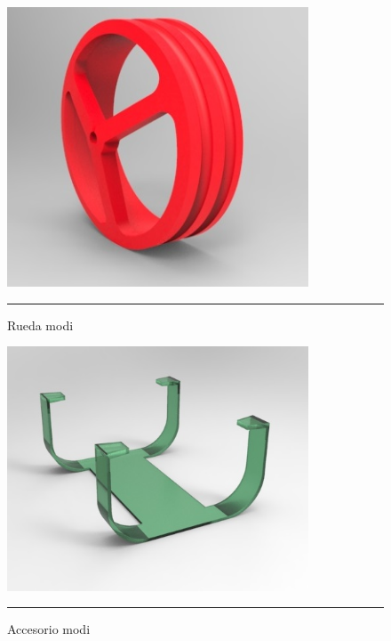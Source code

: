 \begin{figure}[htbp]
	\centering
		\includegraphics[width=0.8\textwidth]{./Figures/MODI/ruedamodi.jpg}
		\rule{35em}{0.5pt}
	\caption[ruedamodi]{Rueda modi}
	\label{fig:ruedamodi}
\end{figure}

\begin{figure}[htbp]
	\centering
		\includegraphics[width=0.8\textwidth]{./Figures/MODI/accesorio.jpg}
		\rule{35em}{0.5pt}
	\caption[accesorio]{Accesorio modi}
	\label{fig:accesorio}
\end{figure}

